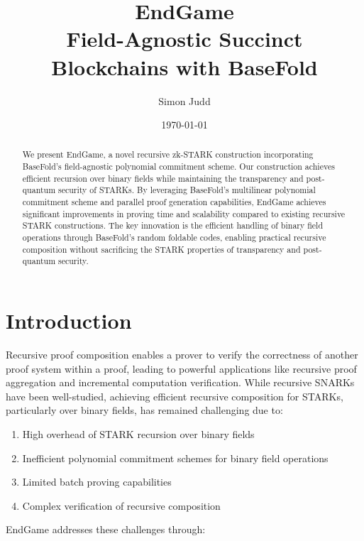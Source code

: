 \documentclass{article}
\theoremstyle{plain}
\theoremstyle{definition}
\theoremstyle{remark}
\theoremstyle{problem}
\begin{document}
\title{EndGame \\[1ex] \large Field-Agnostic Succinct Blockchains with BaseFold}
\author{Simon Judd}
\date{\today}

\maketitle

\begin{abstract}
We present EndGame, a novel recursive zk-STARK construction incorporating BaseFold's field-agnostic polynomial commitment scheme. Our construction achieves efficient recursion over binary fields while maintaining the transparency and post-quantum security of STARKs. By leveraging BaseFold's multilinear polynomial commitment scheme and parallel proof generation capabilities, EndGame achieves significant improvements in proving time and scalability compared to existing recursive STARK constructions. The key innovation is the efficient handling of binary field operations through BaseFold's random foldable codes, enabling practical recursive composition without sacrificing the STARK properties of transparency and post-quantum security.
\end{abstract}

\tableofcontents

\section{Introduction}
Recursive proof composition enables a prover to verify the correctness of another proof system within a proof, leading to powerful applications like recursive proof aggregation and incremental computation verification. While recursive SNARKs have been well-studied, achieving efficient recursive composition for STARKs, particularly over binary fields, has remained challenging due to:

\begin{enumerate}
    \item High overhead of STARK recursion over binary fields
    \item Inefficient polynomial commitment schemes for binary field operations
    \item Limited batch proving capabilities
    \item Complex verification of recursive composition
\end{enumerate}

EndGame addresses these challenges through:
\end{document}
